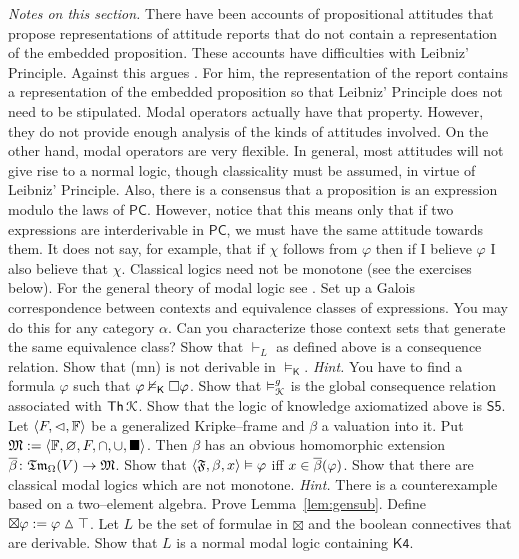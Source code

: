 {\it Notes on this section.}
There have been accounts of propositional attitudes that propose 
representations of attitude reports that do not contain a 
representation of the embedded proposition. These accounts have 
difficulties with Leibniz' Principle. Against this argues
\cite{recanati:oratio}. 
For him, the representation of the report 
contains a representation of the embedded proposition so that 
Leibniz' Principle does not need to be stipulated. Modal operators 
actually have that property. However, they do not provide enough 
analysis of the kinds of attitudes involved. On the other hand, 
modal operators are very flexible. In general, most attitudes will 
not give rise to a normal logic, though classicality 
must be assumed, in virtue of Leibniz' Principle. Also, there is a 
consensus that a proposition is an expression modulo the laws
of $\mathsf{PC}$. However, notice that this means only that if two
expressions are interderivable in $\mathsf{PC}$, we must have the same
attitude towards them. It does not say, for example, that if
$\chi$ follows from $\varphi$ then if I believe $\varphi$ I
also believe that $\chi$. Classical logics need not be monotone
(see the exercises below).  For the general theory of modal logic
see \cite{kracht:tools}.
\vplatz
\exercise
Set up a Galois correspondence between contexts and equivalence
classes of expressions. You may do this for any category $\alpha$.
Can you characterize those context sets that generate the same
equivalence class?
\vplatz
\exercise
Show that $\vdash_{L}$ as defined above is a consequence
relation. Show that (mn) is not derivable in
$\vDash_{\mathsf{K}}$. {\it Hint.} You have to find a
formula $\varphi$ such that $\varphi \nvDash_{\mathsf{K}}
\square \varphi$.
\vplatz 
\exercise 
Show that $\vDash_{\mathcal{K}}^g$ is the global consequence relation
associated with $\mathsf{Th}\, \mathcal{K}$.
\vplatz
\exercise
Show that the logic of knowledge axiomatized above is $\mathsf{S5}$.
\vplatz
\exercise
Let $\langle F, \lhd, \mathbb{F}\rangle$ be a generalized Kripke--frame and
$\beta$ a valuation into it. Put $\mathfrak{M} := \langle \mathbb{F}, \varnothing, F, \cap,
\cup, \blacksquare\rangle$. Then $\beta$ has an obvious homomorphic extension
$\overline{\beta} \colon \mathfrak{Tm}_{\Omega}(V) \rightarrow \mathfrak{M}$. Show that
$\langle \mathfrak{F}, \beta, x\rangle \vDash \varphi$ iff
$x \in \overline{\beta}(\varphi)$.
\vplatz
\exercise
Show that there are classical modal logics which are not monotone.
{\it Hint.} There is a counterexample based on a two--element
algebra.
\vplatz
\exercise
Prove Lemma~\ref{lem:gensub}.
\vplatz
\exercise
Define $\boxtimes \varphi := \varphi \vartriangle \top$. Let $L$ 
be the set of formulae in $\boxtimes$ and the boolean connectives 
that are derivable. Show that $L$ is a normal modal logic
containing $\mathsf{K4}$.
